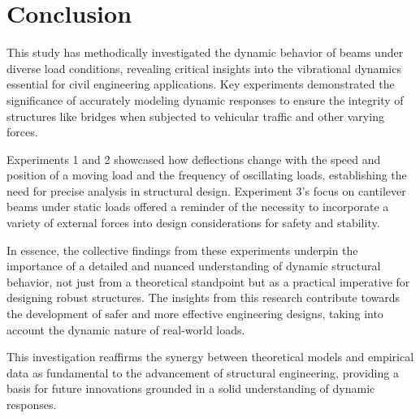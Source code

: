 \documentclass[conference]{IEEEtran}
\begin{document}
\section{Conclusion}
This study has methodically investigated the dynamic behavior of beams under diverse load conditions, revealing critical insights into the vibrational dynamics essential for civil engineering applications. Key experiments demonstrated the significance of accurately modeling dynamic responses to ensure the integrity of structures like bridges when subjected to vehicular traffic and other varying forces.

Experiments 1 and 2 showcased how deflections change with the speed and position of a moving load and the frequency of oscillating loads, establishing the need for precise analysis in structural design. Experiment 3's focus on cantilever beams under static loads offered a reminder of the necessity to incorporate a variety of external forces into design considerations for safety and stability.

In essence, the collective findings from these experiments underpin the importance of a detailed and nuanced understanding of dynamic structural behavior, not just from a theoretical standpoint but as a practical imperative for designing robust structures. The insights from this research contribute towards the development of safer and more effective engineering designs, taking into account the dynamic nature of real-world loads.

This investigation reaffirms the synergy between theoretical models and empirical data as fundamental to the advancement of structural engineering, providing a basis for future innovations grounded in a solid understanding of dynamic responses.
\end{document}
